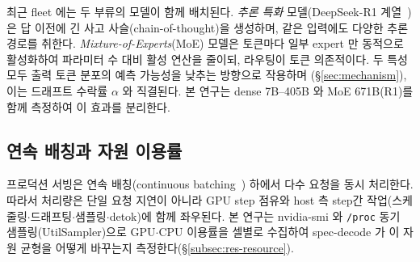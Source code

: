 최근 fleet 에는 두 부류의 모델이 함께 배치된다.
\emph{추론 특화} 모델(DeepSeek-R1 계열~\cite{deepseekr1})은 답 이전에 긴
사고 사슬(chain-of-thought)을 생성하며, 같은 입력에도 다양한 추론 경로를 취한다.
\emph{Mixture-of-Experts}(MoE) 모델은 토큰마다 일부 expert 만 동적으로 활성화하여
파라미터 수 대비 활성 연산을 줄이되, 라우팅이 토큰 의존적이다.
두 특성 모두 출력 토큰 분포의 예측 가능성을 낮추는 방향으로 작용하며
(\S\ref{sec:mechanism}), 이는 드래프트 수락률 $\alpha$ 와 직결된다.
본 연구는 dense 7B--405B 와 MoE 671B(R1)를 함께 측정하여 이 효과를 분리한다.

\subsection{연속 배칭과 자원 이용률}
\label{subsec:cb-bg}

프로덕션 서빙은 연속 배칭(continuous batching~\cite{yu2022orca}) 하에서
다수 요청을 동시 처리한다. 따라서 처리량은 단일 요청 지연이 아니라
GPU step 점유와 host 측 step간 작업(스케줄링$\cdot$드래프팅$\cdot$샘플링$\cdot$detok)에
함께 좌우된다. 본 연구는 nvidia-smi 와 \texttt{/proc} 동기 샘플링(UtilSampler)으로
GPU$\cdot$CPU 이용률을 셀별로 수집하여 spec-decode 가 이 자원 균형을
어떻게 바꾸는지 측정한다(\S\ref{subsec:res-resource}).
